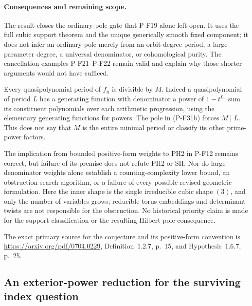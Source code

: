 \documentclass[11pt,a4paper]{article}
\begin{document}
\paragraph{Consequences and remaining scope.}
The result closes the ordinary-pole gate that P-F19 alone
left open. It uses the full cubic support theorem and the
unique generically smooth fixed component; it does not
infer an ordinary pole merely from an orbit degree period,
a large parameter degree, a universal denominator, or
cohomological purity. The cancellation examples P-F21--P-F22
remain valid and explain why those shorter arguments
would not have sufficed.

Every quasipolynomial period of $f_n$ is divisible by $M$.
Indeed a quasipolynomial of period $L$ has a generating
function with denominator a power of $1-t^L$: sum its
constituent polynomials over each arithmetic progression,
using the elementary generating functions for powers.
The pole in (P-F31b) forces $M\mid L$. This does not say
that $M$ is the entire minimal period or classify its
other prime-power factors.

The implication from bounded positive-form weights to
PH2 in P-F12 remains correct, but failure of its premise
does not refute PH2 or SH. Nor do large denominator
weights alone establish a counting-complexity lower bound,
an obstruction search algorithm, or a failure of every
possible revised geometric formulation. Here the inner
shape is the single irreducible cubic shape $(3)$, and
only the number of variables grows; reducible torus
embeddings and determinant twists are not responsible
for the obstruction. No historical priority claim is
made for the support classification or the resulting
Hilbert-pole consequence.

The exact primary source for the conjecture and its
positive-form convention is
\url{https://arxiv.org/pdf/0704.0229},
Definition~1.2.7, p.~15, and Hypothesis~1.6.7, p.~25.


\subsection{An exterior-power reduction for the surviving index question}
\end{document}
